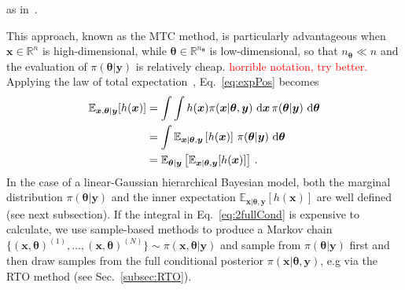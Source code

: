 as in~\cite[Lemma 2]{fox2016fast}.

This approach, known as the MTC method, is particularly advantageous when $\bm{x}\in \mathbb{R}^n$ is high-dimensional, while $\bm{\theta}\in \mathbb{R}^{n_{\bm{\theta}}}$ is low-dimensional, so that $n_{\bm{\theta}} \ll n$ and the evaluation of $\pi(\bm{\theta}| \bm{y})$ is relatively cheap. \textcolor{red}{horrible notation, try better.}
Applying the law of total expectation~\cite{champ2022generalizedlawtotalcovariance}, Eq.~\eqref{eq:expPos} becomes
\begin{align}
	\mathbb{E}_{\bm{x} ,\bm{\theta}  |\bm{y}} [h(\bm{x})] &= \int \int   h(\bm{x}) \pi(\bm{x} |  \bm{\theta}, \bm{y}) \, \mathop{}\!\mathrm{d} \bm{x} \,  \pi(\bm{\theta} |   \bm{y}) \, \mathop{}\!\mathrm{d} \bm{\theta} \\
	&= \int \mathbb{E}_{\bm{x} |  \bm{\theta}, \bm{y}} \left[ h(\bm{x}) \right] \, \pi(\bm{\theta} |  \bm{y}) \, \mathop{}\!\mathrm{d} \bm{\theta}\label{eq:2fullCond} \\
		&= \mathbb{E}_{\bm{\theta} |  \bm{y}} \left[ \mathbb{E}_{\bm{x} |  \bm{\theta}, \bm{y}} [h(\bm{x})] \right] \, .
	\label{eq:fullCond}
\end{align}
In the case of a linear-Gaussian hierarchical Bayesian model, both the marginal distribution $\pi (\bm{\theta}| \bm{y})$ %
and the inner expectation $\mathbb{E}_{\bm{x} |  \bm{\theta}, \bm{y}} \left[ h(\bm{x}) \right]$ are well defined (see next subsection).
If the integral in Eq.~\ref{eq:2fullCond} is expensive to calculate, we use sample-based methods to produce a Markov chain $\{ (\bm{x}, \bm{\theta})^{(1)}, \dots, (\bm{x}, \bm{\theta})^{(N)} \} \sim \pi(\bm{x}, \bm{\theta} |  \bm{y}) $ and sample from $\pi(\bm{\theta} |  \bm{y})$ first and then draw samples from the full conditional posterior $\pi(\bm{x} | \bm{\theta} , \bm{y})$, e.g via the RTO method (see Sec.~\ref{subsec:RTO}). 


